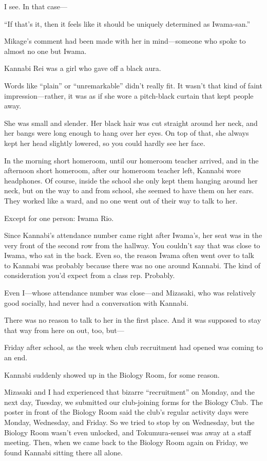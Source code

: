 \documentclass[
    a4paper,
    12pt,
    twoside,
    openany,
    UTF8,
    fontset=windows
]{ctexbook}
\begin{document}
I see. In that case---

``If that's it, then it feels like it should be uniquely determined as Iwama-san.''

Mikage's comment had been made with her in mind---someone who spoke to almost no one but Iwama.

Kannabi Rei was a girl who gave off a black aura.

Words like ``plain'' or ``unremarkable'' didn't really fit. It wasn't that kind of faint impression---rather, it was as if she wore a pitch-black curtain that kept people away.

She was small and slender. Her black hair was cut straight around her neck, and her bangs were long enough to hang over her eyes. On top of that, she always kept her head slightly lowered, so you could hardly see her face.

In the morning short homeroom, until our homeroom teacher arrived, and in the afternoon short homeroom, after our homeroom teacher left, Kannabi wore headphones. Of course, inside the school she only kept them hanging around her neck, but on the way to and from school, she seemed to have them on her ears. They worked like a ward, and no one went out of their way to talk to her.

Except for one person: Iwama Rio.

Since Kannabi's attendance number came right after Iwama's, her seat was in the very front of the second row from the hallway. You couldn't say that was close to Iwama, who sat in the back. Even so, the reason Iwama often went over to talk to Kannabi was probably because there was no one around Kannabi. The kind of consideration you'd expect from a class rep. Probably.

Even I---whose attendance number was close---and Mizasaki, who was relatively good socially, had never had a conversation with Kannabi.

There was no reason to talk to her in the first place. And it was supposed to stay that way from here on out, too, but---

Friday after school, as the week when club recruitment had opened was coming to an end.

Kannabi suddenly showed up in the Biology Room, for some reason.

Mizasaki and I had experienced that bizarre ``recruitment'' on Monday, and the next day, Tuesday, we submitted our club-joining forms for the Biology Club. The poster in front of the Biology Room said the club's regular activity days were Monday, Wednesday, and Friday. So we tried to stop by on Wednesday, but the Biology Room wasn't even unlocked, and Tokumura-sensei was away at a staff meeting. Then, when we came back to the Biology Room again on Friday, we found Kannabi sitting there all alone.
\end{document}
